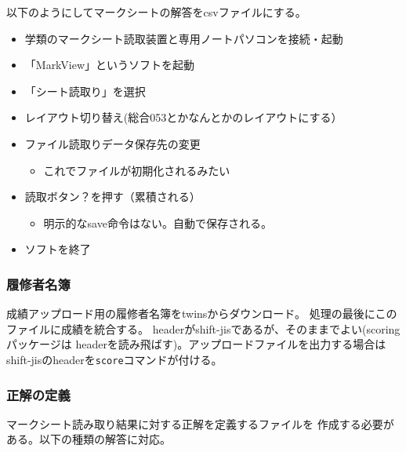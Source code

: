 以下のようにしてマークシートの解答をcsvファイルにする。

\begin{itemize}
\item 学類のマークシート読取装置と専用ノートパソコンを接続・起動

\item 「MarkView」というソフトを起動

\item 「シート読取り」を選択

\item レイアウト切り替え(総合053とかなんとかのレイアウトにする）

\item ファイル読取りデータ保存先の変更

\begin{itemize}
\item これでファイルが初期化されるみたい

\end{itemize}

\item 読取ボタン？を押す（累積される）

\begin{itemize}
\item 明示的なsave命令はない。自動で保存される。

\end{itemize}

\item ソフトを終了

\end{itemize}

\subsubsection{履修者名簿}
\label{履修者名簿}

成績アップロード用の履修者名簿をtwinsからダウンロード。
処理の最後にこのファイルに成績を統合する。
headerがshift-jisであるが、そのままでよい(scoringパッケージは
headerを読み飛ばす)。アップロードファイルを出力する場合は
shift-jisのheaderを\texttt{score}コマンドが付ける。

\subsubsection{正解の定義}
\label{正解の定義}

マークシート読み取り結果に対する正解を定義するファイルを
作成する必要がある。以下の種類の解答に対応。

